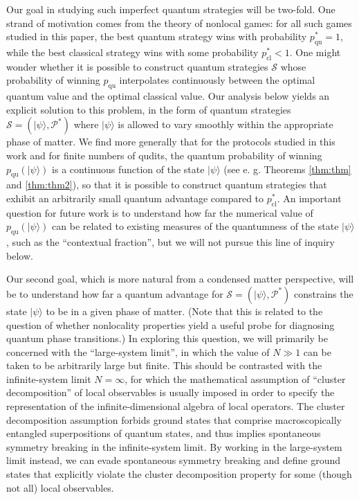 \documentclass[prb,twocolumn,showpacs,amssymb,superscriptaddress]{revtex4-2}
\begin{document}
Our goal in studying such imperfect quantum strategies will be two-fold. One strand of motivation comes from the theory of nonlocal games: for all such games studied in this paper, the best quantum strategy wins with probability $p^*_{\mathrm{qu}}=1$, while the best classical strategy wins with some probability $p^*_{\mathrm{cl}} < 1$. One might wonder whether it is possible to construct quantum strategies $\mathcal{S}$ whose probability of winning $p_{\mathrm{qu}}$ interpolates continuously between the optimal quantum value and the optimal classical value. Our analysis below yields an explicit solution to this problem, in the form of quantum strategies $\mathcal{S} = (|\psi\rangle,\mathcal{P}^*)$ where $|\psi\rangle$ is allowed to vary smoothly within the appropriate phase of matter. We find more generally that for the protocols studied in this work and for finite numbers of qudits, the quantum probability of winning $p_{\mathrm{qu}}(|\psi\rangle)$ is a continuous function of the state $|\psi\rangle$ (see e. g. Theorems \ref{thm:thm} and \ref{thm:thm2}), so that it is possible to construct quantum strategies that exhibit an arbitrarily small quantum advantage compared to $p_{\mathrm{cl}}^*$. An important question for future work is to understand how far the numerical value of $p_{\mathrm{qu}}(|\psi\rangle)$ can be related to existing measures of the quantumness of the state $|\psi\rangle$, such as the ``contextual fraction''\cite{Abramsky2017}, but we will not pursue this line of inquiry below.

Our second goal, which is more natural from a condensed matter perspective, will be to understand how far a quantum advantage for $\mathcal{S}=(|\psi\rangle,\mathcal{P}^*)$ constrains the state $|\psi\rangle$ to be in a given phase of matter. (Note that this is related to the question of whether nonlocality properties yield a useful probe for diagnosing quantum phase transitions\cite{BellNonloc}.) In exploring this question, we will primarily be concerned with the ``large-system limit'', in which the value of $N \gg 1$ can be taken to be arbitrarily large but finite. This should be contrasted with the infinite-system limit $N=\infty$, for which the mathematical assumption of ``cluster decomposition''\cite{weinberg1995quantum} of local observables is usually imposed in order to specify the representation of the infinite-dimensional algebra of local operators\cite{haag1964algebraic}. The cluster decomposition assumption forbids ground states that comprise macroscopically entangled superpositions of quantum states, and thus implies spontaneous symmetry breaking in the infinite-system limit. By working in the large-system limit instead, we can evade spontaneous symmetry breaking and define ground states that explicitly violate the cluster decomposition property for some (though not all) local observables.
\end{document}
